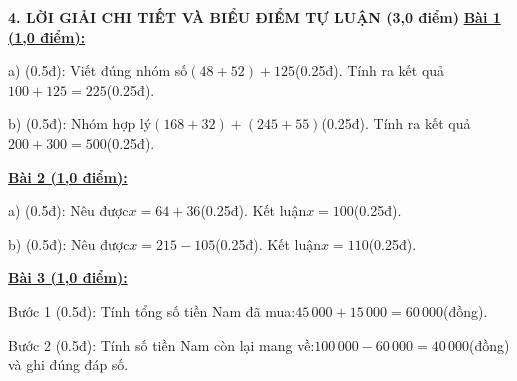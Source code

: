 \documentclass[11pt,a4paper]{article}
\begin{document}
\noindent\textbf{\large 4. LỜI GIẢI CHI TIẾT VÀ BIỂU ĐIỂM TỰ LUẬN (3,0 điểm)}
\vspace{4pt}
\noindent\textbf{\underline{Bài 1 (1,0 điểm):}}\par\vspace{3pt}
a) (0.5đ): Viết đúng nhóm số$(48 + 52) + 125$(0.25đ). Tính ra kết quả$100 + 125 = 225$(0.25đ).\par\noindent b) (0.5đ): Nhóm hợp lý$(168 + 32) + (245 + 55)$(0.25đ). Tính ra kết quả$200 + 300 = 500$(0.25đ).\par\vspace{8pt}

\noindent\textbf{\underline{Bài 2 (1,0 điểm):}}\par\vspace{3pt}
a) (0.5đ): Nêu được$x = 64 + 36$(0.25đ). Kết luận$x = 100$(0.25đ).\par\noindent b) (0.5đ): Nêu được$x = 215 - 105$(0.25đ). Kết luận$x = 110$(0.25đ).\par\vspace{8pt}

\noindent\textbf{\underline{Bài 3 (1,0 điểm):}}\par\vspace{3pt}
Bước 1 (0.5đ): Tính tổng số tiền Nam đã mua:$45\,000 + 15\,000 = 60\,000$(đồng).\par\noindent Bước 2 (0.5đ): Tính số tiền Nam còn lại mang về:$100\,000 - 60\,000 = 40\,000$(đồng) và ghi đúng đáp số.\par\vspace{8pt}
\end{document}
